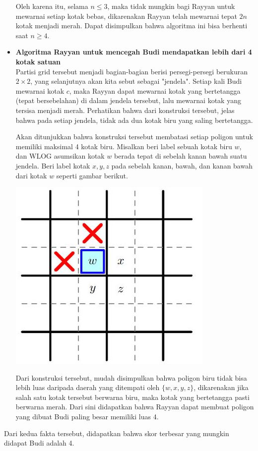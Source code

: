 \documentclass[11pt]{scrartcl}
\begin{document}
\begin{soaljawab}
\begin{solusi}
\begin{itemize}
            Oleh karena itu, selama $n \le 3$, maka tidak mungkin bagi Rayyan untuk mewarnai setiap kotak bebas, dikarenakan Rayyan telah mewarnai tepat $2n$ kotak menjadi merah. Dapat disimpulkan bahwa algoritma ini bisa berhenti saat $n \ge 4$.

            \item \textbf{Algoritma Rayyan untuk mencegah Budi mendapatkan lebih dari 4 kotak satuan}\\
            Partisi grid tersebut menjadi bagian-bagian berisi persegi-persegi berukuran $2 \times 2$, yang selanjutnya akan kita sebut sebagai "jendela". Setiap kali Budi mewarnai kotak $c$, maka Rayyan dapat mewarnai kotak yang bertetangga (tepat bersebelahan) di dalam jendela tersebut, lalu mewarnai kotak yang tersisa menjadi merah. Perhatikan bahwa dari konstruksi tersebut,  jelas bahwa pada setiap jendela, tidak ada dua kotak biru yang saling bertetangga.

            Akan ditunjukkan bahwa konstruksi tersebut membatasi setiap poligon untuk memiliki maksimal 4 kotak biru. Misalkan beri label sebuah kotak biru $w$, dan WLOG asumsikan kotak $w$ berada tepat di sebelah kanan bawah suatu jendela. Beri label kotak $x,y,z$ pada sebelah kanan, bawah, dan kanan bawah dari kotak $w$ seperti gambar berikut.

            \begin{center}
                \includegraphics[scale=1]{gametheory10(1)}
            \end{center}
            
            Dari konstruksi tersebut, mudah disimpulkan bahwa poligon biru tidak bisa lebih luas daripada daerah yang ditempati oleh $\{w,x,y,z\}$, dikarenakan jika salah satu kotak tersebut berwarna biru, maka kotak yang bertetangga pasti berwarna merah. Dari sini didapatkan bahwa Rayyan dapat membuat poligon yang dibuat Budi paling besar memiliki luas 4.
        \end{itemize}
        Dari kedua fakta tersebut, didapatkan bahwa skor terbesar yang mungkin didapat Budi adalah 4.
    \end{solusi}
\end{soaljawab}
\end{document}
